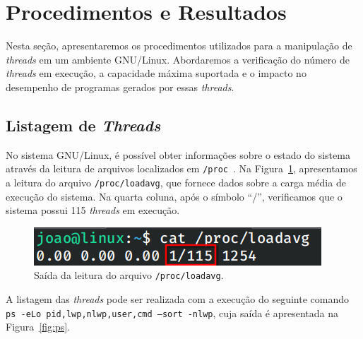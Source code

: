 \documentclass[
	12pt,				%
	oneside,   	        %
	a4paper,			%
	english,			%
	french,				%
	spanish,			%
	brazil,				%
	]{pacotes/abntex2}
\begin{document}
\section{Procedimentos e Resultados}
\label{sec:procedimentos}

Nesta seção, apresentaremos os procedimentos utilizados para a manipulação de \textit{threads} em um ambiente GNU/Linux. Abordaremos a verificação do número de \textit{threads} em execução, a capacidade máxima suportada e o impacto no desempenho de programas gerados por essas \textit{threads}.

\subsection{Listagem de \textit{Threads}}
\label{subsec:list_threads}

No sistema GNU/Linux, é possível obter informações sobre o estado do sistema através da leitura de arquivos localizados em \texttt{/proc}~\cite{negus2012}. Na Figura~\ref{fig:total_tid}, apresentamos a leitura do arquivo \texttt{/proc/loadavg}, que fornece dados sobre a carga média de execução do sistema. Na quarta coluna, após o símbolo ``/'', verificamos que o sistema possui 115 \textit{threads} em execução.

\begin{figure}[H]
  \centering
  \includegraphics[scale=0.45]{figuras/total_tid.png}
  \caption{Saída da leitura do arquivo \texttt{/proc/loadavg}.}
  \label{fig:total_tid}
\end{figure}

A listagem das \textit{threads} pode ser realizada com a execução do seguinte comando \texttt{ps -eLo pid,lwp,nlwp,user,cmd --sort -nlwp}, cuja saída é apresentada na Figura~\ref{fig:ps}.
\end{document}
